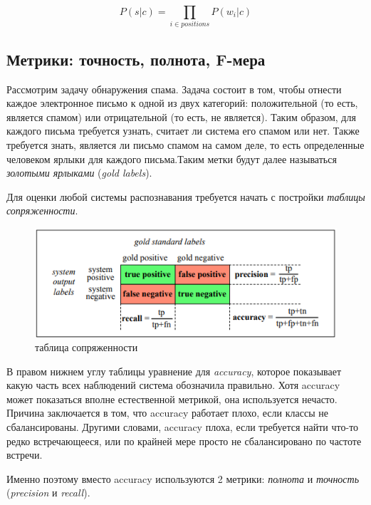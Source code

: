 \documentclass[a4paper,12pt,preview]{report} %
\begin{document}
	 \begin{equation}
	 	P(s | c) = \prod_{i \in positions} P(w_i | c) 
	 \end{equation}
	 
	 \subsection{Метрики: точность, полнота, F-мера}
	 
	 Рассмотрим задачу обнаружения спама. Задача состоит в том, чтобы отнести каждое электронное письмо к одной из двух категорий: положительной (то есть, является спамом) или отрицательной (то есть, не является). Таким образом, для каждого письма требуется узнать, считает ли система его спамом или нет. Также требуется знать, является ли письмо спамом на самом деле, то есть определенные человеком ярлыки для каждого письма.Таким метки будут далее называться \textit{золотыми ярлыками} (\textit{gold labels}).
	 
	 Для оценки любой системы распознавания требуется начать с постройки \textit{таблицы сопряженности}.
	 
	 \begin{figure}[H]
	 	\centering\includegraphics[scale=0.9]{conttable.PNG}
	 	\caption{таблица сопряженности}
	 	\label{fig:conttable}
	 \end{figure}
	 
	 В правом нижнем углу таблицы уравнение для \textit{accuracy}, которое показывает какую часть всех наблюдений система обозначила правильно. Хотя accuracy может показаться вполне естественной метрикой, она используется нечасто. Причина заключается в том, что accuracy работает плохо, если классы не сбалансированы. Другими словами, accuracy плоха, если требуется найти что-то редко встречающееся, или по крайней мере просто не сбалансировано по частоте встречи. 
	 
	 Именно поэтому вместо accuracy используются 2 метрики: \textit{полнота} и \textit{точность} (\textit{precision} и \textit{recall}).
	 
\end{document}

